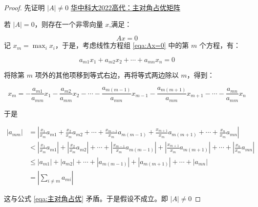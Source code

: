 \documentclass{ctexart}
\numberwithin{equation}{section}    %
\begin{document}
\begin{proof}
先证明 $\lvert A\rvert\neq 0$
    \href{https://www.bilibili.com/video/BV1JY411h71h}{华中科大2022高代：主对角占优矩阵}

若 $\lvert A\rvert=0$，则存在一个非零向量 $x$,满足：

\begin{equation}
    Ax=0
    \label{eqa:Ax=0}
\end{equation}
记 $x_m=\max_{i}x_i$，于是，考虑线性方程组 \eqref{eqa:Ax=0} 中的第 $m$ 个方程，有：

\begin{equation}
a_{m1}x_1+a_{m2}x_2+\cdots+a_{mn}x_n=0
\end{equation}

将除第 $m$ 项外的其他项移到等式右边，再将等式两边除以 $m$，得到：

\begin{equation}
    x_m = -\frac{a_{m1}}{a_{mm}} x_1-\frac{a_{m2}}{a_{mm}} x_2-\cdots- \frac{a_{m(m-1)}}{a_{mm}}x_{m-1}-\frac{a_{m(m+1)}}{a_{mm}}x_{m+1}-\cdots-\frac{a_{mn}}{a_{mm}}x_n
    \end{equation}

    于是

\begin{equation}
    \begin{aligned}
        \lvert a_{mm} \rvert &=\left| \frac{x_1}{x_m} a_{m1}+\frac{x_2}{x_m}a_{m2}+\cdots+ \frac{x_{m-1}}{x_m}a_{m(m-1)}+\frac{x_{m+1}}{x_m}a_{m(m+1)}+\cdots+\frac{x_{n}}{x_m}a_{mn}\right|\\
        &<\left|\frac{x_1}{x_m} a_{m1}\right|+\left|\frac{x_2}{x_m} a_{m2}\right|+\cdots+ \left|\frac{x_{m-1}}{x_m}a_{m(m-1)}\right|+\left|\frac{x_{m+1}}{x_m}a_{m(m+1)}\right|+\cdots+\left|\frac{x_n}{x_m}a_{mn}\right|\\
        &\leqslant |a_{m1}|+|a_{m2}|+\cdots+|a_{m(m-1)}|+|a_{m(m+1)}|+\cdots+|a_{mn}|\\
        &=|\sum_{i\neq m}{a_{mi}}|
    \end{aligned}
    \end{equation}

这与公式 \eqref{eqa:主对角占优} 矛盾。于是假设不成立。即 $|A|\neq 0$
\end{proof}
\end{document}
